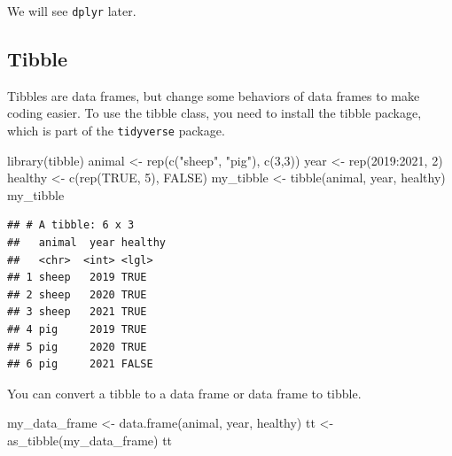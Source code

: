 \documentclass[
]{book}
\newenvironment{Shaded}{\begin{snugshade}}{\end{snugshade}}
\newcommand{\ConstantTok}[1]{\textcolor[rgb]{0.00,0.00,0.00}{#1}}
\newcommand{\DecValTok}[1]{\textcolor[rgb]{0.00,0.00,0.81}{#1}}
\newcommand{\FunctionTok}[1]{\textcolor[rgb]{0.00,0.00,0.00}{#1}}
\newcommand{\NormalTok}[1]{#1}
\newcommand{\OtherTok}[1]{\textcolor[rgb]{0.56,0.35,0.01}{#1}}
\newcommand{\SpecialCharTok}[1]{\textcolor[rgb]{0.00,0.00,0.00}{#1}}
\newcommand{\StringTok}[1]{\textcolor[rgb]{0.31,0.60,0.02}{#1}}
\theoremstyle{definition}
\theoremstyle{definition}
\theoremstyle{definition}
\theoremstyle{definition}
\theoremstyle{remark}
\begin{document}
We will see \texttt{dplyr} later.

\hypertarget{tibble}{%
\subsection{Tibble}\label{tibble}}

Tibbles are data frames, but change some behaviors of data frames to make coding easier. To use the tibble class, you need to install the tibble package, which is part of the \texttt{tidyverse} package.

\begin{Shaded}
\begin{Highlighting}[]
\FunctionTok{library}\NormalTok{(tibble)}
\NormalTok{animal }\OtherTok{\textless{}{-}} \FunctionTok{rep}\NormalTok{(}\FunctionTok{c}\NormalTok{(}\StringTok{"sheep"}\NormalTok{, }\StringTok{"pig"}\NormalTok{), }\FunctionTok{c}\NormalTok{(}\DecValTok{3}\NormalTok{,}\DecValTok{3}\NormalTok{))}
\NormalTok{year }\OtherTok{\textless{}{-}} \FunctionTok{rep}\NormalTok{(}\DecValTok{2019}\SpecialCharTok{:}\DecValTok{2021}\NormalTok{, }\DecValTok{2}\NormalTok{)}
\NormalTok{healthy }\OtherTok{\textless{}{-}} \FunctionTok{c}\NormalTok{(}\FunctionTok{rep}\NormalTok{(}\ConstantTok{TRUE}\NormalTok{, }\DecValTok{5}\NormalTok{), }\ConstantTok{FALSE}\NormalTok{)}
\NormalTok{my\_tibble }\OtherTok{\textless{}{-}} \FunctionTok{tibble}\NormalTok{(animal, year, healthy)}
\NormalTok{my\_tibble}
\end{Highlighting}
\end{Shaded}

\begin{verbatim}
## # A tibble: 6 x 3
##   animal  year healthy
##   <chr>  <int> <lgl>  
## 1 sheep   2019 TRUE   
## 2 sheep   2020 TRUE   
## 3 sheep   2021 TRUE   
## 4 pig     2019 TRUE   
## 5 pig     2020 TRUE   
## 6 pig     2021 FALSE
\end{verbatim}

You can convert a tibble to a data frame or data frame to tibble.

\begin{Shaded}
\begin{Highlighting}[]
\NormalTok{my\_data\_frame }\OtherTok{\textless{}{-}} \FunctionTok{data.frame}\NormalTok{(animal, year,  healthy)}
\NormalTok{tt }\OtherTok{\textless{}{-}} \FunctionTok{as\_tibble}\NormalTok{(my\_data\_frame)}
\NormalTok{tt}
\end{Highlighting}
\end{Shaded}
\end{document}
